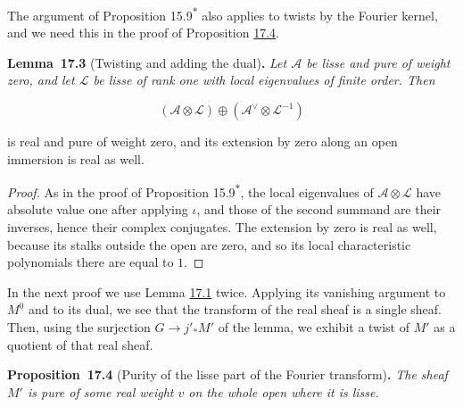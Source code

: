 \documentclass[11pt]{article}
\newenvironment{bpstatement}[2]{\par\addvspace{0.6\baselineskip}\noindent\textbf{#1}#2\textbf{.}\enspace\ignorespaces}
  {\par\addvspace{0.4\baselineskip}}
\newenvironment{bpstatementit}[2]{\begin{bpstatement}{#1}{#2}\itshape\ignorespaces}{\end{bpstatement}}
\newcommand{\bpout}[1]{#1\textsuperscript{\hyperlink{bp-outside}{\ensuremath{\ast}}}}
\begin{document}
\label{bp8}%
The argument of Proposition \bpout{15.9} also applies to twists by the Fourier kernel, and we need this in the proof of Proposition \hyperref[bp12]{17.4}.

\label{bp9}%
\begin{bpstatementit}{Lemma~17.3}{ (Twisting and adding the dual)}
Let \(\mathcal A\) be lisse and pure of weight zero, and let \(\mathcal L\) be lisse of rank one with local eigenvalues of finite order. Then

\[
(\mathcal A\otimes\mathcal L)
\oplus(\mathcal A^\vee\otimes\mathcal L^{-1})
\]

is real and pure of weight zero, and its extension by zero along an open immersion is real as well.
\end{bpstatementit}

\begin{proof}[{Proof}]\label{bp10}%
As in the proof of Proposition \bpout{15.9}, the local eigenvalues of \(\mathcal A\otimes\mathcal L\) have absolute value one after applying \(\iota\), and those of the second summand are their inverses, hence their complex conjugates. The extension by zero is real as well, because its stalks outside the open are zero, and so its local characteristic polynomials there are equal to \(1\).
\end{proof}

\label{bp11}%
In the next proof we use Lemma \hyperref[bp5]{17.1} twice. Applying its vanishing argument to \(M^0\) and to its dual, we see that the transform of the real sheaf is a single sheaf. Then, using the surjection \(G\to j'_*M'\) of the lemma, we exhibit a twist of \(M'\) as a quotient of that real sheaf.

\label{bp12}%
\begin{bpstatementit}{Proposition~17.4}{ (Purity of the lisse part of the Fourier transform)}
The sheaf \(M'\) is pure of some real weight \(v\) on the whole open where it is lisse.
\end{bpstatementit}
\end{document}
